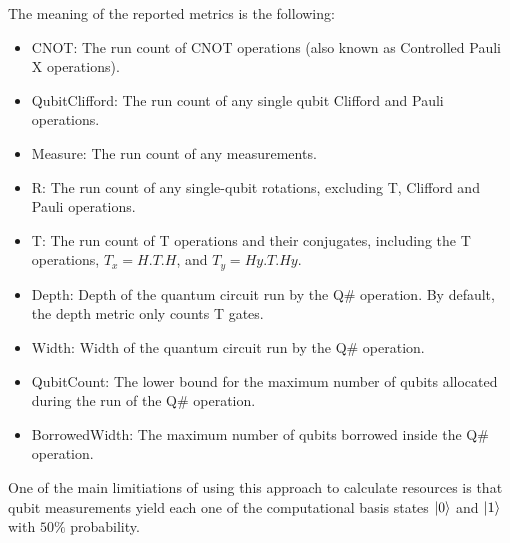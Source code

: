 The meaning of the reported metrics is the following:
\begin{itemize}
    \item CNOT: The run count of CNOT operations (also known as Controlled Pauli X operations).
    \item QubitClifford: The run count of any single qubit Clifford and Pauli operations.
    \item Measure: The run count of any measurements.
    \item R: The run count of any single-qubit rotations, excluding T, Clifford and Pauli operations.
    \item T: The run count of T operations and their conjugates, including the T operations, $T_x = H.T.H$, and $T_y = Hy.T.Hy$.
    \item Depth: Depth of the quantum circuit run by the Q\# operation. By default, the depth metric only counts T gates.
    \item Width: Width of the quantum circuit run by the Q\# operation.
    \item QubitCount: The lower bound for the maximum number of qubits allocated during the run of the Q\# operation.
    \item BorrowedWidth: The maximum number of qubits borrowed inside the Q\# operation.
\end{itemize}

One of the main limitiations of using this approach to calculate resources is that qubit measurements yield each one of the computational basis states $\left|{0}\right\rangle$ and $\left|{1}\right\rangle$ with $50\%$ probability.
